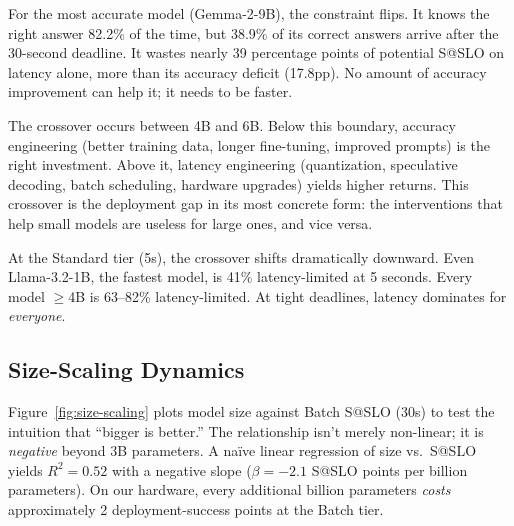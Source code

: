 \documentclass[11pt]{article}
\begin{document}
For the most accurate model (Gemma-2-9B), the constraint flips.  It knows the right answer 82.2\% of the time, but 38.9\% of its correct answers arrive after the 30-second deadline.  It wastes nearly 39 percentage points of potential S@SLO on latency alone, more than its accuracy deficit (17.8pp).  No amount of accuracy improvement can help it; it needs to be faster.

The crossover occurs between 4B and 6B.  Below this boundary, accuracy engineering (better training data, longer fine-tuning, improved prompts) is the right investment.  Above it, latency engineering (quantization, speculative decoding, batch scheduling, hardware upgrades) yields higher returns.  This crossover is the deployment gap in its most concrete form: the interventions that help small models are useless for large ones, and vice versa.

At the Standard tier (5s), the crossover shifts dramatically downward.  Even Llama-3.2-1B, the fastest model, is 41\% latency-limited at 5 seconds.  Every model $\geq$4B is 63--82\% latency-limited.  At tight deadlines, latency dominates for \emph{everyone}.

\subsection{Size-Scaling Dynamics}

Figure~\ref{fig:size-scaling} plots model size against Batch S@SLO (30s) to test the intuition that ``bigger is better.''  The relationship isn't merely non-linear; it is \emph{negative} beyond 3B parameters.  A na\"ive linear regression of size vs.\ S@SLO yields $R^2 = 0.52$ with a negative slope ($\beta = -2.1$ S@SLO points per billion parameters).  On our hardware, every additional billion parameters \emph{costs} approximately 2 deployment-success points at the Batch tier.
\end{document}

